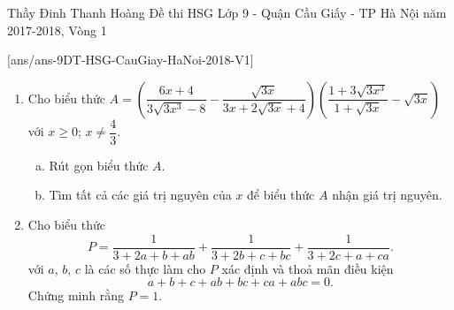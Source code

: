 
\begin{name}
{Thầy Đinh Thanh Hoàng}
{Đề thi HSG Lớp 9 - Quận Cầu Giấy - TP Hà Nội năm 2017-2018, Vòng 1}
\end{name}
\setcounter{ex}{0}
[ans/ans-9DT-HSG-CauGiay-HaNoi-2018-V1]
\begin{ex}%
\hfill
\begin{enumerate}[\bf 1)]
	\item Cho biểu thức $A = \left(\dfrac{6x+4}{3\sqrt{3x^3}-8} - \dfrac{\sqrt{3x}}{3x+2\sqrt{3x}+4}\right) \left(\dfrac{1+3\sqrt{3x^3}}{1+\sqrt{3x}} - \sqrt{3x}\right)$ với $x\ge 0$; $x\ne \dfrac{4}{3}$.
			\begin{enumerate}[a)]
				\item Rút gọn biểu thức $A$.
				\item Tìm tất cả các giá trị nguyên của $x$ để biểu thức $A$ nhận giá trị nguyên.
			\end{enumerate}
	\item Cho biểu thức $$P=\dfrac{1}{3+2a+b+ab}+\dfrac{1}{3+2b+c+bc}+\dfrac{1}{3+2c+a+ca}.$$
			với $a$, $b$, $c$ là các số thực làm cho $P$ xác định và thoả mãn điều kiện $$a+b+c+ab+bc+ca+abc=0.$$
			Chứng minh rằng $P = 1$.
\end{enumerate} 
\end{ex}
